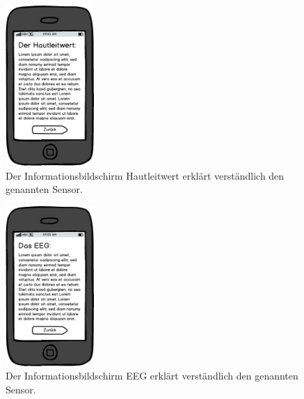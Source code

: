 \documentclass[10pt, a4paper, oneside, titlepage]{scrartcl} %
\begin{document}
	\newpage
	\begin{figure}[ht!]
		\begin{center}
			\includegraphics[width=0.3\textwidth]{mockup_11_skinconductance.png}
		\end{center}
		\caption[Mockup Infobildschirm Hautleitwert]{Der Informationsbildschirm Hautleitwert erklärt verständlich den genannten Sensor.}
		\label{fig:mockup_11}
	\end{figure}	
	\begin{figure}[h!]
		\begin{center}
			\includegraphics[width=0.3\textwidth]{mockup_12_eeg.png}
		\end{center}
		\caption[Mockup Infobildschirm EEG]{Der Informationsbildschirm EEG erklärt verständlich den genannten Sensor.}
		\label{fig:mockup_12}
	\end{figure}	
\end{document}
